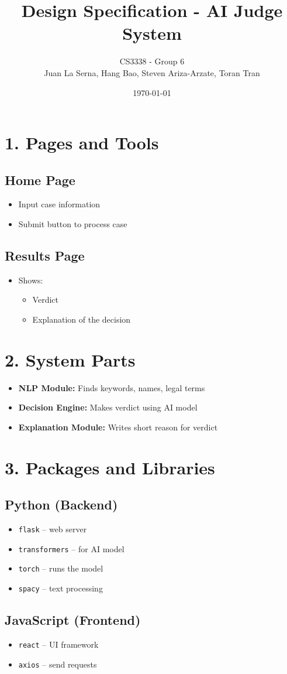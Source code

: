 \documentclass{article}
\title{Design Specification - AI Judge System}
\author{CS3338 - Group 6 \\ Juan La Serna, Hang Bao, Steven Ariza-Arzate, Toran Tran}
\date{\today}
\begin{document}
\maketitle

\section*{1. Pages and Tools}

\subsection*{Home Page}
\begin{itemize}
  \item Input case information
  \item Submit button to process case
\end{itemize}

\subsection*{Results Page}
\begin{itemize}
  \item Shows:
    \begin{itemize}
      \item Verdict
      \item Explanation of the decision
    \end{itemize}
\end{itemize}

\section*{2. System Parts}
\begin{itemize}
  \item \textbf{NLP Module:} Finds keywords, names, legal terms
  \item \textbf{Decision Engine:} Makes verdict using AI model
  \item \textbf{Explanation Module:} Writes short reason for verdict
\end{itemize}

\section*{3. Packages and Libraries}

\subsection*{Python (Backend)}
\begin{itemize}
  \item \texttt{flask} -- web server
  \item \texttt{transformers} -- for AI model
  \item \texttt{torch} -- runs the model
  \item \texttt{spacy} -- text processing
\end{itemize}

\subsection*{JavaScript (Frontend)}
\begin{itemize}
  \item \texttt{react} -- UI framework
  \item \texttt{axios} -- send requests
\end{itemize}
\end{document}

